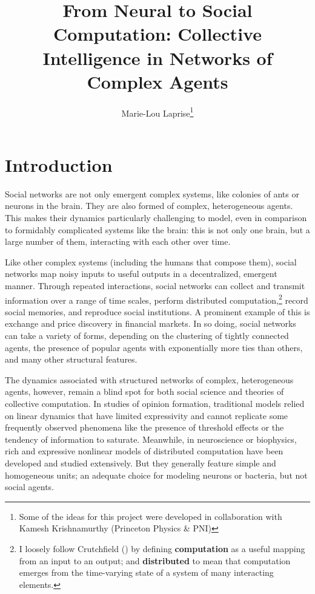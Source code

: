 \documentclass[]{article}
\title{From Neural to Social Computation: Collective Intelligence in Networks of Complex Agents}
\author{Marie-Lou Laprise\footnote{Some of the ideas for this project were developed in collaboration with Kamesh Krishnamurthy (Princeton Physics \& PNI)}}
\begin{document}
	
	\maketitle
\section{Introduction}


Social networks are not only emergent complex systems, like colonies of ants or neurons in the brain. They are also formed of complex, heterogeneous agents. This makes their dynamics particularly challenging to model, even in comparison to formidably complicated systems like the brain: this is not only one brain, but a large number of them, interacting with each other over time. 

Like other complex systems (including the humans that compose them), social networks map noisy inputs to useful outputs in a decentralized, emergent manner.  Through repeated interactions, social networks can collect and transmit information over a range of time scales, perform distributed computation,\footnote{ I loosely follow Crutchfield (\cite{crutchfieldCalculiEmergenceComputation1994}) by defining \textbf{computation} as a useful mapping from an input to an output; and \textbf{distributed} to mean that computation emerges from the time-varying state of a system of many interacting elements.} record social memories, and reproduce social institutions. A prominent example of this is exchange and price discovery in financial markets. In so doing, social networks can take a variety of forms, depending on the clustering of tightly connected agents, the presence of popular agents with exponentially more ties than others, and many other structural features.

The dynamics associated with structured networks of complex, heterogeneous agents, however, remain a blind spot for both social science and theories of collective computation. In studies of opinion formation, traditional models relied on linear dynamics that have limited expressivity and cannot replicate some frequently observed phenomena like the presence of threshold effects or the tendency of information to saturate. Meanwhile, in neuroscience or biophysics, rich and expressive nonlinear models of distributed computation have been developed and studied extensively. But they generally feature simple and homogeneous units; an adequate choice for modeling neurons or bacteria, but not social agents. 
\end{document}
